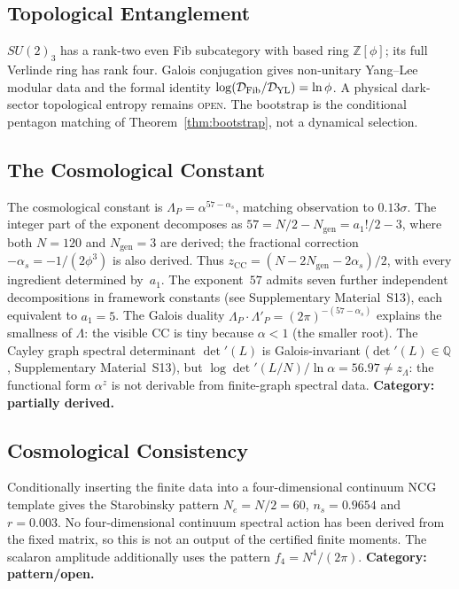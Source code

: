 \documentclass[12pt,a4paper]{article}
\theoremstyle{definition}
\begin{document}
\subsection{Topological Entanglement}
\label{sec:tqft}

$SU(2)_3$ has a rank-two even Fib subcategory with based ring \(\mathbb Z[\phi]\); its full Verlinde ring has rank four.  Galois conjugation gives non-unitary Yang--Lee modular data and the formal identity \(\log(\mathcal D_{\rm Fib}/\mathcal D_{\rm YL})=\ln\phi\).  A physical dark-sector topological entropy remains \textsc{open}.  The bootstrap is the conditional pentagon matching of Theorem~\ref{thm:bootstrap}, not a dynamical selection.

\subsection{The Cosmological Constant}
\label{sec:cc}

The cosmological constant is $\Lambda_P = \alpha^{57-\alpha_s}$, matching observation to $0.13\sigma$.  The integer part of the exponent decomposes as $57 = N/2 - N_{\mathrm{gen}} = a_1!/2 - 3$, where both $N = 120$ and $N_{\mathrm{gen}} = 3$ are derived; the fractional correction $-\alpha_s = -1/(2\phi^3)$ is also derived.  Thus $z_{\mathrm{CC}} = (N - 2N_{\mathrm{gen}} - 2\alpha_s)/2$, with every ingredient determined by~$a_1$.  The exponent~$57$ admits seven further independent decompositions in framework constants (see Supplementary Material~S13), each equivalent to $a_1 = 5$.  The Galois duality $\Lambda_P \cdot \Lambda'_P = (2\pi)^{-(57-\alpha_s)}$ explains the smallness of $\Lambda$: the visible CC is tiny because $\alpha < 1$ (the smaller root).  The Cayley graph spectral determinant $\det'(L)$ is Galois-invariant ($\det'(L) \in \mathbb{Q}$, Supplementary Material~S13), but $\log\det'(L/N)/\ln\alpha = 56.97 \neq z_\Lambda$: the functional form $\alpha^z$ is not derivable from finite-graph spectral data.  \textbf{Category: partially derived.}

\subsection{Cosmological Consistency}
\label{sec:cosmo}

Conditionally inserting the finite data into a four-dimensional continuum NCG template gives the Starobinsky pattern $N_e=N/2=60$, $n_s=0.9654$ and $r=0.003$.  No four-dimensional continuum spectral action has been derived from the fixed matrix, so this is not an output of the certified finite moments.  The scalaron amplitude additionally uses the pattern $f_4=N^4/(2\pi)$.  \textbf{Category: pattern/open.}
\end{document}
